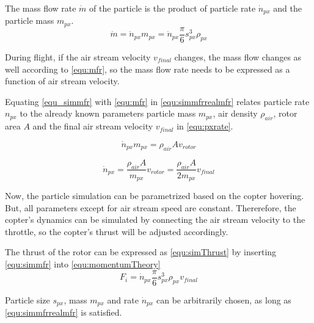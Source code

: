     The mass flow rate $\dot m$ of the particle is the product of particle rate $\dot n_{px}$ and the particle mass $m_{px}$.
    \begin{equation}
    \dot m =  \dot n_{px} m_{px}= \dot n_{px}  \frac{\pi}{6}s_{px}^3  \rho_{px}
    \label{equ_simmfr}
    \end{equation}
    
    During flight, if the air stream velocity $v_{final}$ changes, the mass flow changes as well according to \ref{equ:mfr}, so the mass flow rate needs to be expressed as a function of air stream velocity. 
    
    Equating \ref{equ_simmfr} with  \ref{equ:mfr} in \ref{equ:simmfrrealmfr} relates particle rate $n_{px}$ to the already known parameters particle mass $m_{px}$, air density $\rho_{air}$, rotor area $A$ and the final air stream velocity $v_{final}$ in \ref{equ:pxrate}.
    
    \begin{equation}
    \dot n_{px} m_{px} =  \rho_{air} A v_{rotor}
    \label{equ:simmfrrealmfr}
    \end{equation}
    
    \begin{equation}
    \dot n_{px} = \frac{\rho_{air} A}{m_{px}} v_{rotor} = \frac{\rho_{air} A}{2m_{px}} v_{final}
    \label{equ:pxrate}
    \end{equation}
    
    Now, the particle simulation can be parametrized based on the copter hovering. 
    But, all parameters except for air stream speed are constant.
    Thererefore,  the copter's dynamics can be simulated by connecting the air stream velocity to the throttle, so the copter's thrust will be adjusted accordingly.
    
    The thrust of the rotor can be expressed as \ref{equ:simThrust} by inserting \ref{equ:simmfr} into \ref{equ:momentumTheory}
    \begin{equation}
    F_i = \dot n_{px}  \frac{\pi}{6}s_{px}^3  \rho_{px} v_{final}
    \end{equation}
    
    Particle size $s_{px}$, mass $m_{px}$ and rate $\dot n_{px}$ can be arbitrarily chosen, as long as \ref{equ:simmfrrealmfr} is satisfied.
    
    
    \begin{table}
    \label{tab:particlesPerStep}
    \end{table}
    

